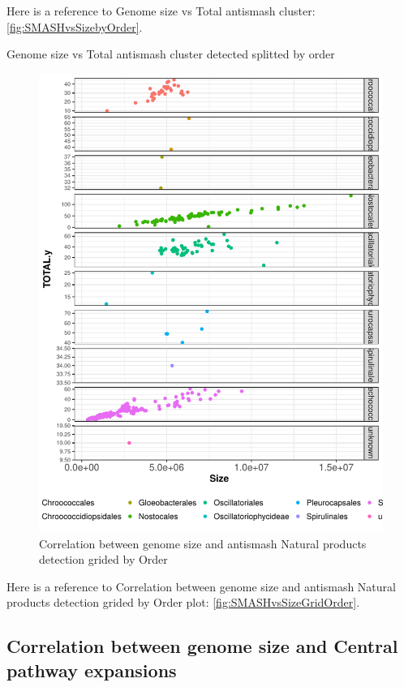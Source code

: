 \documentclass[12pt,twoside]{reedthesis}
\begin{document}
  Here is a reference to Genome size vs Total antismash cluster:
  \autoref{fig:SMASHvsSizebyOrder}. \clearpage
  
  Genome size vs Total antismash cluster detected splitted by order
  
  \begin{figure}[h!tbp]
  \centering
  \includegraphics[angle = 0,scale = 0.6]{chapter5/SMASHvsSizeGridOrder.pdf}
  \caption[Correlation between genome size and antismash Natural products detection grided by Order]{\normalsize{Correlation between genome size and antismash Natural products detection grided by Order}}
  \label{fig:SMASHvsSizeGridOrder}
  \end{figure}
  
  Here is a reference to Correlation between genome size and antismash
  Natural products detection grided by Order plot:
  \autoref{fig:SMASHvsSizeGridOrder}. \clearpage 
  
  \subsection{Correlation between genome size and Central pathway
  expansions}\label{correlation-between-genome-size-and-central-pathway-expansions-2}
  
\end{document}
